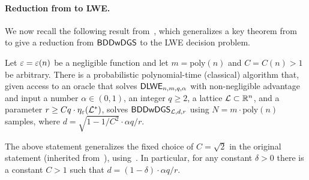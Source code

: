 



\paragraph{Reduction from \BDDwDGS to LWE.}

We now recall the following result from~\cite{STOC:PeiRegSte17},
which generalizes a key theorem from~\cite{Reg09} to give a reduction
from $\mathsf{BDDwDGS}$ to the LWE decision problem.

\begin{theorem}
  \label{thm:bddwdgs-to-dlwe}
  Let $\varepsilon = \varepsilon(n)$ be a negligible function and let
  $m=\text{poly}(n)$ and $C=C(n) > 1$ be arbitrary.  There is a
  probabilistic polynomial-time (classical) algorithm that, given
  access to an oracle that solves $\textsf{\upshape\mdseries DLWE}_{n,m,q,\alpha}$ with
  non-negligible advantage and input a number $\alpha \in (0,1)$, an
  integer $q \geq 2$, a lattice $\mathcal{L} \subset \mathbb{R}^{n}$, and a
  parameter $r \geq C q \cdot \eta_{\varepsilon}(\mathcal{L}^{*})$, solves
  $\mathsf{BDDwDGS}_{\mathcal{L},d,r}$ using $N=m \cdot \text{poly}(n)$ samples,
  where $d = \sqrt{1-1/C^{2}} \cdot \alpha q/r$.
\end{theorem}

\begin{remark}
  \label{rem:PRS-generalized}
  The above statement generalizes the fixed choice of $C=\sqrt{2}$ in
  the original statement (inherited from~\cite[Section~3.2.1]{Reg09}),
  using~\cite[Corollary~3.10]{Reg09}. In particular, for any constant
  $\delta > 0$ there is a constant $C > 1$ such that
  $d = (1-\delta) \cdot \alpha q / r$.
\end{remark}


